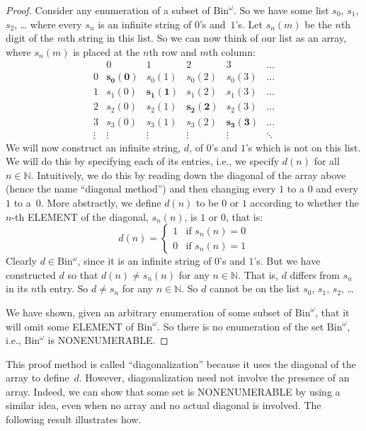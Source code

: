 \documentclass[10pt,a4paper]{article}
\newcommand*{\olup}[1]{\MakeUppercase{#1}}
\theoremstyle{plain}
\theoremstyle{definition}
\theoremstyle{remark}
\newenvironment{explain}{}{}
\providecommand{\Nat}{\ensuremath{\mathbb{N}}}
\providecommand{\Bin}{\mathrm{Bin}}
\begin{document}
\begin{proof}
Consider any enumeration of a subset of $\Bin^\omega$. So we have some
list $s_{0}$, $s_{1}$, $s_{2}$, \dots{} where every $s_n$ is an
infinite string of $0$'s and~$1$'s. Let $s_n(m)$ be the $n$th digit of
the $m$th string in this list. So we can now think of our list as an
array, where $s_n(m)$ is placed at the $n$th row and $m$th column:
\[
\begin{array}{c|c|c|c|c|c}
& 0 & 1 & 2 & 3 & \dots \\\hline
0 & \mathbf{s_{0}(0)} & s_{0}(1) & s_{0}(2) & s_0(3) & \dots \\\hline
1 & s_{1}(0)& \mathbf{s_{1}(1)} & s_1(2) & s_1(3) & \dots \\\hline
2 & s_{2}(0)& s_{2}(1) & \mathbf{s_2(2)} & s_2(3) & \dots \\\hline
3 & s_{3}(0)& s_{3}(1) & s_3(2) & \mathbf{s_3(3)} & \dots \\\hline
\vdots & \vdots & \vdots & \vdots & \vdots & \mathbf{\ddots}
\end{array}
\]
We will now construct an infinite string, $d$, of $0$'s and $1$'s
which is not on this list.  We will do this by specifying each of its
entries, i.e., we specify $d(n)$ for all $n \in \Nat$.  Intuitively,
we do this by reading down the diagonal of the array above (hence the
name ``diagonal method'') and then changing every $1$ to a $0$ and
every $1$ to a~$0$. More abstractly, we define $d(n)$ to be $0$ or $1$
according to whether the $n$-th \olup{element} of the diagonal, $s_n(n)$,
is $1$ or $0$, that is:
\[
d(n) =
\begin{cases}
1 & \text{if $s_{n}(n) = 0$}\\
0 & \text{if $s_{n}(n) = 1$}
\end{cases}
\]
Clearly $d \in \Bin^\omega$, since it is an infinite string of $0$'s
and $1$'s. But we have constructed $d$ so that $d(n) \neq s_n(n)$ for
any $n \in \Nat$. That is, $d$ differs from $s_n$ in its $n$th entry.
So $d \neq s_n$ for any $n\in \Nat$. So $d$ cannot be on the list
$s_0$, $s_1$, $s_2$,
\dots

We have shown, given an arbitrary enumeration of some subset of
$\Bin^\omega$, that it will omit some \olup{element} of $\Bin^\omega$. So
there is no enumeration of the set $\Bin^\omega$, i.e., $\Bin^\omega$
is \olup{nonenumerable}.
\end{proof}

\begin{explain}
This proof method is called ``diagonalization'' because it uses the
diagonal of the array to define~$d$. However, diagonalization need
not involve the presence of an array. Indeed, we can show that some set is 
\olup{nonenumerable} by using a similar idea, even when no array and no
actual diagonal is involved. The following result illustrates how.
\end{explain}
\end{document}
